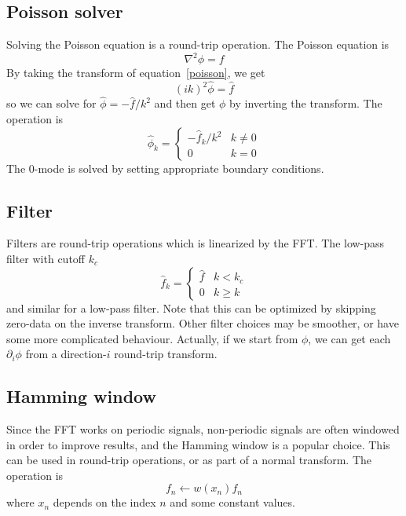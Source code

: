 \documentclass[12pt]{article}
\renewcommand{\(}{\left(}
\renewcommand{\)}{\right)}
\begin{document}
\subsection{Poisson solver}

Solving the Poisson equation is a round-trip operation.  The Poisson
equation is
\begin{dmath}
  \label{poisson}
  \nabla^2 \phi = f
\end{dmath}
By taking the transform of equation~\eqref{poisson}, we get
\begin{dmath}
  (ik)^2 \hat{\phi} = \hat{f}
\end{dmath}
so we can solve for $\hat{\phi} = -\hat{f}/k^2$ and then
get $\phi$ by inverting the transform.  The operation is
\begin{dmath}
\hat\phi_{k} = \begin{cases}
  -\hat{f}_k/{k^2}  & k\neq 0  \\
  0 & k=0
  \end{cases}
\end{dmath}
The $0$-mode is solved by setting appropriate boundary conditions.  

\subsection{Filter}

Filters are round-trip operations which is linearized by the FFT.  The
low-pass filter with cutoff $k_c$ 
\begin{dmath}
\hat{f}_{k} = \begin{cases}
  \hat{f}  & k < k_c  \\
  0  & k \geq k
  \end{cases}
\end{dmath}
and similar for a low-pass filter.  Note that this can be optimized by
skipping zero-data on the inverse transform.  Other filter choices may
be smoother, or have some more complicated behaviour.  Actually, if we
start from $\phi$, we can get each $\partial_i\phi$ from a
direction-$i$ round-trip transform.

\subsection{Hamming window}

Since the FFT works on periodic signals, non-periodic signals are
often windowed in order to improve results, and the Hamming window is
a popular choice.  This can be used in round-trip operations, or as
part of a normal transform.  The operation is
\begin{dmath}
  f_n \leftarrow w(x_n) f_n
\end{dmath}
where $x_n$ depends on the index $n$ and some constant values.
\end{document}
